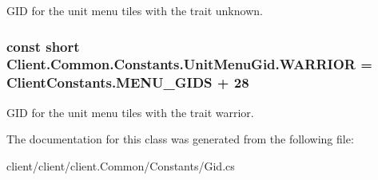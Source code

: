 G\+I\+D for the unit menu tiles with the trait unknown. 

\hypertarget{classClient_1_1Common_1_1Constants_1_1UnitMenuGid_afd701a2b6d3978be717ebae8353e0169}{}
\subsubsection[{W\+A\+R\+R\+I\+O\+R}]{\setlength{\rightskip}{0pt plus 5cm}const short Client.\+Common.\+Constants.\+Unit\+Menu\+Gid.\+W\+A\+R\+R\+I\+O\+R = {\bf Client\+Constants.\+M\+E\+N\+U\+\_\+\+G\+I\+D\+S} + 28}\label{classClient_1_1Common_1_1Constants_1_1UnitMenuGid_afd701a2b6d3978be717ebae8353e0169}


G\+I\+D for the unit menu tiles with the trait warrior. 



The documentation for this class was generated from the following file\+:\begin{DoxyCompactItemize}
\item 
client/client/client.\+Common/\+Constants/Gid.\+cs\end{DoxyCompactItemize}
